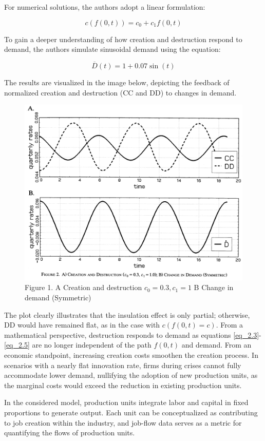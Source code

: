 \documentclass[12pt]{article}
\begin{document}
For numerical solutions, the authors adopt a linear formulation:

\[c(f(0,t))=c_0+c_1f(0,t)\]

To gain a deeper understanding of how creation and destruction respond to demand, the authors simulate sinusoidal demand
using the equation: 

\[\overline{D}(t)=1+0.07\sin(t)\]

The results are visualized in the image below, depicting the feedback of normalized creation and destruction (CC and DD)
to changes in demand. 

\begin{figure}
    \centering
    \includegraphics[scale = 0.4]{Plot2.1.png}
    \caption{Figure 1. A Creation and destruction \(c_0=0.3, c_1=1\) B Change in demand (Symmetric)}
    \label{plot:2.1}
\end{figure}

The plot clearly illustrates that the insulation effect is only partial; otherwise, DD would have remained flat, as in
the case with \(c(f(0,t)=c)\). From a mathematical perspective, destruction responds to demand as equations
\ref{eq_2.3}-\ref{eq_2.5} are no longer independent of the path \(f(0,t)\) and demand. From an economic standpoint,
increasing creation costs smoothen the creation process. In scenarios with a nearly flat innovation rate, firms during
crises cannot fully accommodate lower demand, nullifying the adoption of new production units, as the marginal costs
would exceed the reduction in existing production units. \par
In the considered model, production units integrate labor and capital in fixed proportions to generate output. Each unit
can be conceptualized as contributing to job creation within the industry, and job-flow data serves as a metric for
quantifying the flows of production units. 
\end{document}
